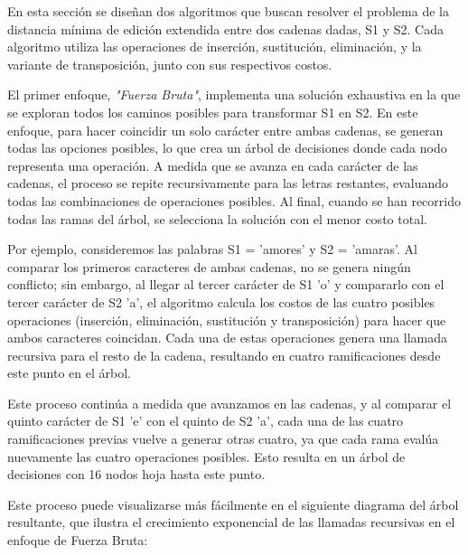 En esta sección se diseñan dos algoritmos que buscan resolver el problema de la distancia mínima de edición extendida entre dos cadenas dadas, S1 y S2. Cada algoritmo utiliza las operaciones de inserción, sustitución, eliminación, y la variante de transposición, junto con sus respectivos costos.

El primer enfoque, \textit{"Fuerza Bruta"}, implementa una solución exhaustiva en la que se exploran todos los caminos posibles para transformar S1 en S2. En este enfoque, para hacer coincidir un solo carácter entre ambas cadenas, se generan todas las opciones posibles, lo que crea un árbol de decisiones donde cada nodo representa una operación. A medida que se avanza en cada carácter de las cadenas, el proceso se repite recursivamente para las letras restantes, evaluando todas las combinaciones de operaciones posibles. Al final, cuando se han recorrido todas las ramas del árbol, se selecciona la solución con el menor costo total.

Por ejemplo, consideremos las palabras S1 = 'amores' y S2 = 'amaras'. Al comparar los primeros caracteres de ambas cadenas, no se genera ningún conflicto; sin embargo, al llegar al tercer carácter de S1 'o' y compararlo con el tercer carácter de S2 'a', el algoritmo calcula los costos de las cuatro posibles operaciones (inserción, eliminación, sustitución y transposición) para hacer que ambos caracteres coincidan. Cada una de estas operaciones genera una llamada recursiva para el resto de la cadena, resultando en cuatro ramificaciones desde este punto en el árbol.

Este proceso continúa a medida que avanzamos en las cadenas, y al comparar el quinto carácter de S1 'e' con el quinto de S2 'a', cada una de las cuatro ramificaciones previas vuelve a generar otras cuatro, ya que cada rama evalúa nuevamente las cuatro operaciones posibles. Esto resulta en un árbol de decisiones con 16 nodos hoja hasta este punto.

Este proceso puede visualizarse más fácilmente en el siguiente diagrama del árbol resultante, que ilustra el crecimiento exponencial de las llamadas recursivas en el enfoque de Fuerza Bruta:
 
